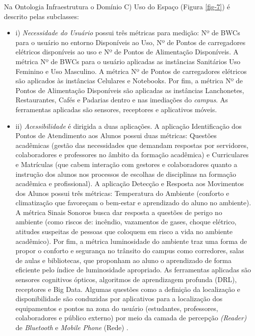 \documentclass[portuguese]{textolivre}
\begin{document}
Na Ontologia Infraestrutura o Domínio C) Uso do Espaço (Figura \ref{fig-7}) é descrito pelas subclasses:

\medskip
\begin{itemize}
\item i) \textit{Necessidade do Usuário} possui três métricas para medição: Nº de BWCs para o usuário no entorno Disponíveis ao Uso, Nº de Pontos de carregadores elétricos disponíveis ao uso e Nº de Pontos de Alimentação Disponíveis. A métrica Nº de BWCs para o usuário aplicadas as instâncias Sanitários Uso Feminino e Uso Masculino. A métrica Nº de Pontos de carregadores elétricos são aplicados às instâncias Celulares e Notebooks. Por fim, a métrica Nº de Pontos de Alimentação Disponíveis são aplicadas as instâncias Lanchonetes, Restaurantes, Cafés e Padarias dentro e nas imediações do \textit{campus}. As ferramentas aplicadas são sensores, receptores e aplicativos móveis.
\item ii) \textit{Acessibilidade} é dirigida a duas aplicações. A aplicação Identificação dos Pontos de Atendimento aos Alunos possui duas métricas: Questões acadêmicas (gestão das necessidades que demandam respostas por servidores, colaboradores e professores no âmbito da formação acadêmica) e Curriculares e Matrículas (que cabem interação com gestores e colaboradores quanto a instrução dos alunos nos processos de escolhas de disciplinas na formação acadêmica e profissional). A aplicação Detecção e Resposta aos Movimentos dos Alunos possui três métricas: Temperatura do Ambiente (conforto e climatização que favoreçam o bem-estar e aprendizado do aluno no ambiente). A métrica Sinais Sonoros busca dar resposta a questões de perigo no ambiente (como riscos de: incêndio, vazamentos de gases, choque elétrico, atitudes suspeitas de pessoas que coloquem em risco a vida no ambiente acadêmico). Por fim, a métrica luminosidade do ambiente traz uma forma de propor o conforto e segurança no trânsito do campus como corredores, salas de aulas e bibliotecas, que proponham ao aluno o aprendizado de forma eficiente pelo índice de luminosidade apropriado. As ferramentas aplicadas são sensores cognitivos ópticos, algoritmos de aprendizagem profunda (DRL), receptores e Big Data. Algumas questões como a definição da localização e disponibilidade são conduzidas por aplicativos para a localização dos equipamentos e pontos na zona do usuário (estudantes, professores, colaboradores e público externo) por meio da camada de percepção \textit{(Reader)} de \textit{Bluetooth} e \textit{Mobile Phone} (Rede) \cite{fang2018}. 
\end{itemize}
\medskip
\end{document}
